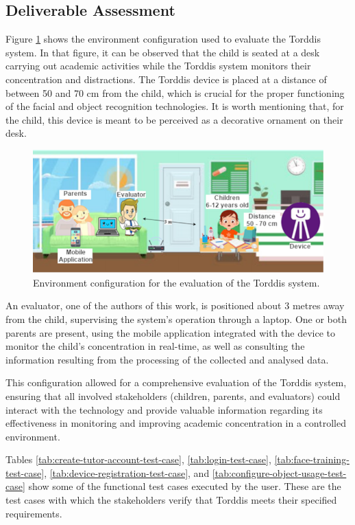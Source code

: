 \documentclass[a4paper,fleqn]{cas-sc}
\begin{document}
		\subsection{Deliverable Assessment}
			Figure \ref{fig:ConfigEvaluation} shows the environment configuration used to evaluate the Torddis system. In that figure, it can be observed that the child is seated at a desk carrying out academic activities while the Torddis system monitors their concentration and distractions. The Torddis device is placed at a distance of between 50 and 70 cm from the child, which is crucial for the proper functioning of the facial  and object recognition technologies. It is worth mentioning that, for the child, this device is meant to be perceived as a decorative ornament on their desk.
			
			\begin{figure}[hbt!]
				\centering
				\includegraphics[width=\linewidth]{figs/Figure_10}
				\caption{Environment configuration for the evaluation of the Torddis system. \label{fig:ConfigEvaluation}} 
			\end{figure}
			
			An evaluator, one of the authors of this work, is positioned about 3 metres away from the child, supervising the system's operation through a laptop. One or both parents are present, using the mobile application integrated with the device to monitor the child's concentration in real-time, as well as consulting the information resulting from the processing of the collected and analysed data.
			
			This configuration allowed for a comprehensive evaluation of the Torddis system, ensuring that all involved stakeholders (children, parents, and evaluators) could interact with the technology and provide valuable information regarding its effectiveness in monitoring and improving academic concentration in a controlled environment.
			
			Tables \ref{tab:create-tutor-account-test-case}, \ref{tab:login-test-case}, \ref{tab:face-training-test-case}, \ref{tab:device-registration-test-case}, and \ref{tab:configure-object-usage-test-case} show some of the functional test cases executed by the user. These are the test cases with which the stakeholders verify that Torddis meets their specified  requirements.
			
\end{document}
